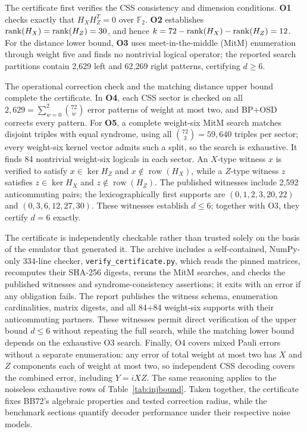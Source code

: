 \documentclass[pdflatex,sn-mathphys-num]{sn-jnl}
\theoremstyle{thmstyleone}
\theoremstyle{thmstyletwo}
\theoremstyle{thmstylethree}
\begin{document}
The certificate first verifies the CSS consistency and dimension conditions. \textbf{O1} checks exactly that $H_XH_Z^T=0$ over $\mathbb{F}_2$. \textbf{O2} establishes $\operatorname{rank}(H_X)=\operatorname{rank}(H_Z)=30$, and hence $k=72-\operatorname{rank}(H_X)-\operatorname{rank}(H_Z)=12$. For the distance lower bound, \textbf{O3} uses meet-in-the-middle (MitM) enumeration through weight five and finds no nontrivial logical operator; the reported search partitions contain 2{,}629 left and 62{,}269 right patterns, certifying $d\ge6$.

The operational correction check and the matching distance upper bound complete the certificate. In \textbf{O4}, each CSS sector is checked on all $2{,}629=\sum_{w=0}^{2}\binom{72}{w}$ error patterns of weight at most two, and BP+OSD corrects every pattern. For \textbf{O5}, a complete weight-six MitM search matches disjoint triples with equal syndrome, using all $\binom{72}{3}=59{,}640$ triples per sector; every weight-six kernel vector admits such a split, so the search is exhaustive. It finds 84 nontrivial weight-six logicals in each sector. An $X$-type witness $x$ is verified to satisfy $x\in\ker H_Z$ and $x\notin\operatorname{row}(H_X)$, while a $Z$-type witness $z$ satisfies $z\in\ker H_X$ and $z\notin\operatorname{row}(H_Z)$. The published witnesses include 2{,}592 anticommuting pairs; the lexicographically first supports are $(0,1,2,3,20,22)$ and $(0,3,6,12,27,30)$. These witnesses establish $d\le6$; together with O3, they certify $d=6$ exactly.

The certificate is independently checkable rather than trusted solely on the basis of the emulator that generated it. The archive includes a self-contained, NumPy-only 334-line checker, \texttt{verify\_certificate.py}, which reads the pinned matrices, recomputes their SHA-256 digests, reruns the MitM searches, and checks the published witnesses and syndrome-consistency assertions; it exits with an error if any obligation fails. The report publishes the witness schema, enumeration cardinalities, matrix digests, and all 84+84 weight-six supports with their anticommuting partners. These witnesses permit direct verification of the upper bound $d\le6$ without repeating the full search, while the matching lower bound depends on the exhaustive O3 search. Finally, O4 covers mixed Pauli errors without a separate enumeration: any error of total weight at most two has $X$ and $Z$ components each of weight at most two, so independent CSS decoding covers the combined error, including $Y=iXZ$. The same reasoning applies to the noiseless exhaustive rows of Table~\ref{tab:injbound}. Taken together, the certificate fixes BB72's algebraic properties and tested correction radius, while the benchmark sections quantify decoder performance under their respective noise models.
\end{document}
